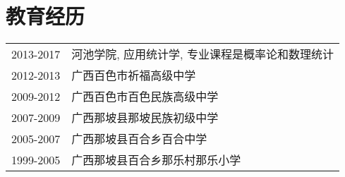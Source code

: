 \chapter{教育经历}
\begin{tabular}{ll}
  2013-2017 & 河池学院, 应用统计学, 专业课程是概率论和数理统计 \\
  2012-2013 & 广西百色市祈福高级中学 \\
  2009-2012 & 广西百色市百色民族高级中学  \\
  2007-2009 & 广西那坡县那坡民族初级中学  \\
  2005-2007 & 广西那坡县百合乡百合中学  \\
  1999-2005 & 广西那坡县百合乡那乐村那乐小学 \\
\end{tabular}
